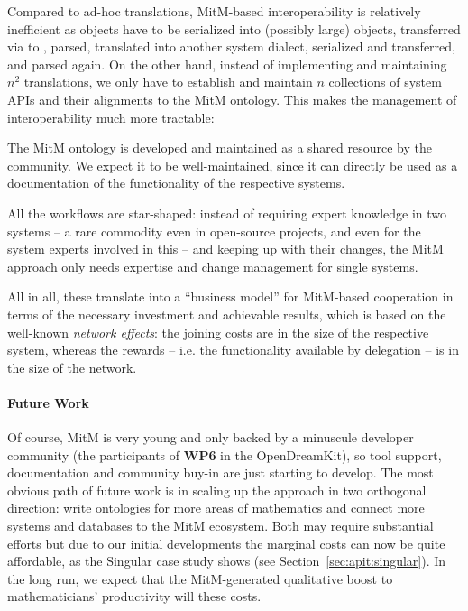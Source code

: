 Compared to ad-hoc translations, MitM-based interoperability is relatively inefficient as objects have to be serialized into (possibly large) \OMMT objects, transferred via \SCSCP to \MMT, parsed, translated into another system dialect, serialized and transferred, and parsed again.
On the other hand, instead of implementing and maintaining $n^2$ translations, we only have to establish and maintain $n$ collections of system APIs and their alignments to the
MitM ontology.
This makes the management of interoperability much more tractable:
\begin{compactenum}
\item The MitM ontology is developed and maintained as a shared resource by the community.
We expect it to be well-maintained, since it can directly be used as a documentation of the functionality of the respective systems.
\item All the workflows are star-shaped: instead of requiring expert knowledge in two systems -- a rare commodity even in open-source projects, and even for the system experts involved in this \papertype -- and keeping up with their changes, the MitM approach only needs expertise and change management for single systems.
\end{compactenum}
All in all, these translate into a ``business model'' for MitM-based cooperation in terms of the necessary investment and achievable results, which is based on the well-known \emph{network effects}: the joining costs are in the size of the respective system, whereas the rewards -- i.e. the functionality available by delegation -- is in the size of the network.

\paragraph{Future Work}
Of course, MitM is very young and only backed by a minuscule developer community (the participants of \textbf{WP6} in the OpenDreamKit), so tool support, documentation and community buy-in are just starting to develop.
The most obvious path of future work is in scaling up the approach in two orthogonal direction: write ontologies for more areas of mathematics and connect more systems and databases to the MitM ecosystem.
Both may require substantial efforts but due to our initial developments the marginal costs can now be quite affordable, as the Singular case study shows (see Section~\ref{sec:apit:singular}). 
In the long run, we expect that the MitM-generated qualitative boost to mathematicians' productivity will these costs.

